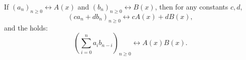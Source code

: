 If $(a_n)_{n \geq 0} \leftrightarrow A(x)$ and $(b_n)_{n \geq 0} \leftrightarrow B(x)$, then for any constants $c, d$,
$$(c a_n + d b_n)_{n \geq 0} \leftrightarrow cA(x) + dB(x),$$
and the  holds:
$$\left( \sum_{i=0}^{n} a_i b_{n-i} \right)_{n \geq 0} \leftrightarrow A(x) B(x).$$
